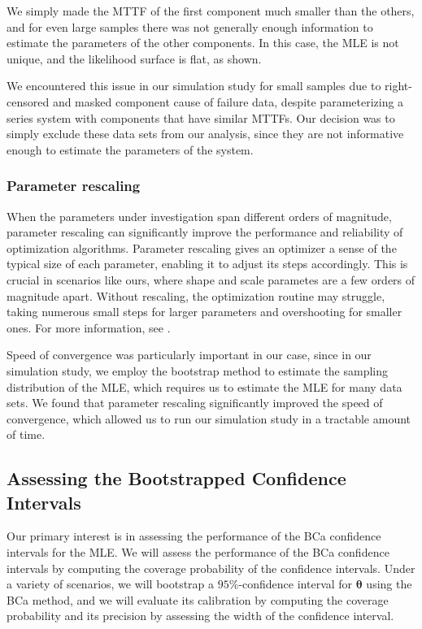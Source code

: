 \documentclass[
]{article}
\begin{document}
We simply made the MTTF of the first component much smaller than the
others, and for even large samples there was not generally enough
information to estimate the parameters of the other components. In this
case, the MLE is not unique, and the likelihood surface is flat, as
shown.

We encountered this issue in our simulation study for small samples due
to right-censored and masked component cause of failure data, despite
parameterizing a series system with components that have similar MTTFs.
Our decision was to simply exclude these data sets from our analysis,
since they are not informative enough to estimate the parameters of the
system.

\hypertarget{parameter-rescaling}{%
\subsubsection*{Parameter rescaling}\label{parameter-rescaling}}

When the parameters under investigation span different orders of
magnitude, parameter rescaling can significantly improve the performance
and reliability of optimization algorithms. Parameter rescaling gives an
optimizer a sense of the typical size of each parameter, enabling it to
adjust its steps accordingly. This is crucial in scenarios like ours,
where shape and scale parametes are a few orders of magnitude apart.
Without rescaling, the optimization routine may struggle, taking
numerous small steps for larger parameters and overshooting for smaller
ones. For more information, see \citep{nocedal2006numerical}.

Speed of convergence was particularly important in our case, since in
our simulation study, we employ the bootstrap method to estimate the
sampling distribution of the MLE, which requires us to estimate the MLE
for many data sets. We found that parameter rescaling significantly
improved the speed of convergence, which allowed us to run our
simulation study in a tractable amount of time.

\hypertarget{assessing-the-bootstrapped-confidence-intervals}{%
\subsection{Assessing the Bootstrapped Confidence
Intervals}\label{assessing-the-bootstrapped-confidence-intervals}}

Our primary interest is in assessing the performance of the BCa
confidence intervals for the MLE. We will assess the performance of the
BCa confidence intervals by computing the coverage probability of the
confidence intervals. Under a variety of scenarios, we will bootstrap a
\(95\%\)-confidence interval for \(\boldsymbol{\theta}\) using the BCa
method, and we will evaluate its calibration by computing the coverage
probability and its precision by assessing the width of the confidence
interval.
\end{document}
